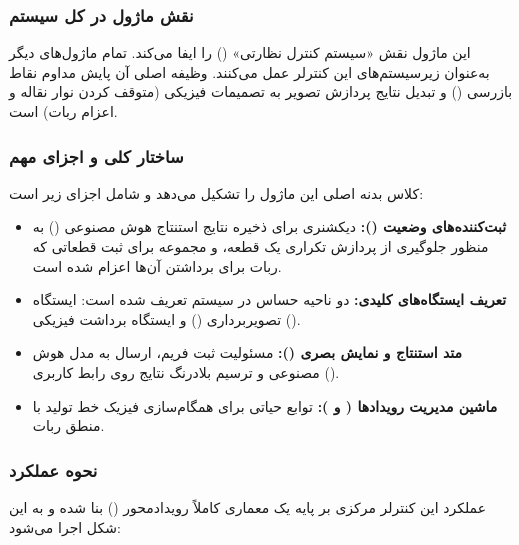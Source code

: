 \documentclass{article}
\begin{document}
\subsubsection{نقش ماژول در کل سیستم}
این ماژول نقش «سیستم کنترل نظارتی» () را ایفا می‌کند. تمام ماژول‌های دیگر به‌عنوان زیرسیستم‌های این کنترلر عمل می‌کنند. وظیفه اصلی آن پایش مداوم نقاط بازرسی () و تبدیل نتایج پردازش تصویر به تصمیمات فیزیکی (متوقف کردن نوار نقاله و اعزام ربات) است.

\subsubsection{ساختار کلی و اجزای مهم}
کلاس  بدنه اصلی این ماژول را تشکیل می‌دهد و شامل اجزای زیر است:

\begin{itemize}
	\item \textbf{ثبت‌کننده‌های وضعیت ():} دیکشنری  برای ذخیره نتایج استنتاج هوش مصنوعی () به منظور جلوگیری از پردازش تکراری یک قطعه، و مجموعه  برای ثبت قطعاتی که ربات برای برداشتن آن‌ها اعزام شده است.
	\item \textbf{تعریف ایستگاه‌های کلیدی:} دو ناحیه حساس در سیستم تعریف شده است: ایستگاه تصویربرداری () و ایستگاه برداشت فیزیکی ().
	\item \textbf{متد استنتاج و نمایش بصری ():} مسئولیت ثبت فریم، ارسال به مدل هوش مصنوعی و ترسیم بلادرنگ نتایج روی رابط کاربری ().
	\item \textbf{ماشین مدیریت رویدادها ( و ):} توابع حیاتی برای همگام‌سازی فیزیک خط تولید با منطق ربات.
\end{itemize}

\subsubsection{نحوه عملکرد}
عملکرد این کنترلر مرکزی بر پایه یک معماری کاملاً رویدادمحور () بنا شده و به این شکل اجرا می‌شود:
\end{document}
